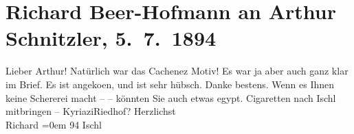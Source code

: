 

         
         \renewcommand{\erwaehntePersonen}{Personen: Richard Beer-Hofmann}
         \renewcommand{\erwaehnteInstitutionen}{Institutionen: Kyriazi Frères}
         \renewcommand{\erwaehnteOrte}{Orte: Bad Ischl, Riedhof, Wien, Ägypten}
         \renewcommand{\erwaehnteWerke}{}
               \section[Richard Beer-Hofmann an Arthur Schnitzler, 5. 7. 1894]{ Richard Beer-Hofmann an Arthur Schnitzler, 5. 7. 1894}\nopagebreak{}\rehead{ }\begin{ledgroupsized}[t]{13cm}\normalsize\beginnumbering \toendnotes[C]{\smallbreak\pagebreak[2]} 
\toendnotes[C]{\smallbreak}\pstart
           \noindent{}{\pb}Lieber Arthur! Natürlich war das Cachenez Motiv! Es war ja aber auch
               ganz klar im Brief. Es ist angeko{\geminationm}en, und ist sehr
               hübsch. Danke {\pb}bestens. Wenn es
               Ihnen keine Schererei macht –  – könnten Sie
               auch etwas egypt. Cigaretten nach Ischl mitbringen – KyriaziRiedhof?\pend
           \pstart
            Herzlichst{\\[\baselineskip]}\spacefill\mbox{Richard}\pend
           \leftskip=0em{}\pstart
           \label{T_L00347-1v}\label{T_L00347-1h} 94{ }Ischl\pend
           
         
         \endnumbering{}\end{ledgroupsized}  \newcommand{\dateiname}{L00347}\newcommand{\titel}{Richard Beer-Hofmann an Arthur Schnitzler, 5. 7. 1894}\newcommand{\editorInnen}{Martin Anton Müller und Gerd-Hermann Susen}
      